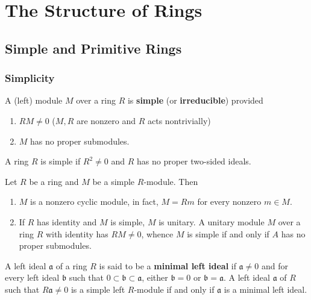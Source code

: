 
\chapter{The Structure of Rings}

\section{Simple and Primitive Rings} %
\subsection{Simplicity} %

\begin{definition}
    A (left) module $M$ over a ring $R$ is \textbf{simple} (or \textbf{irreducible}) provided
    \begin{enumerate}[label=(\roman*)]
        \item $RM\neq 0$ ($M,R$ are nonzero and $R$ acts nontrivially)
        \item $M$ has no proper submodules.
    \end{enumerate}
    A ring $R$ is simple if $R^2 \neq 0$ and $R$ has no proper two-sided ideals.
\end{definition}

\begin{proposition}
    \label{pro: Proposition of simple module}
    Let $R$ be a ring and $M$ be a simple $R$-module. Then

    \begin{enumerate}
        \item
              $M$ is a nonzero cyclic module, in fact, $M=Rm$ for every nonzero $m\in M$.

        \item
              If $R$ has identity and $M$ is simple, $M$ is unitary.
              A unitary module $M$ over a ring $R$ with identity has $RM\neq 0$, whence $M$ is simple if
              and only if $A$ has no proper submodules.
    \end{enumerate}
\end{proposition}

\begin{proposition}
    A left ideal $\mathfrak{a}$ of a ring $R$ is said to be a \textbf{minimal left ideal} if $\mathfrak{a} \neq 0$ and for every left ideal $\mathfrak{b}$ such that $0 \subset \mathfrak{b} \subset \mathfrak{a}$, either $\mathfrak{b}=0$ or $\mathfrak{b}=\mathfrak{a}$.
    A left ideal $\mathfrak{a}$ of $R$ such that $R \mathfrak{a} \neq 0$ is a simple left $R$-module if and only if $\mathfrak{a}$ is a minimal left ideal.
\end{proposition}



